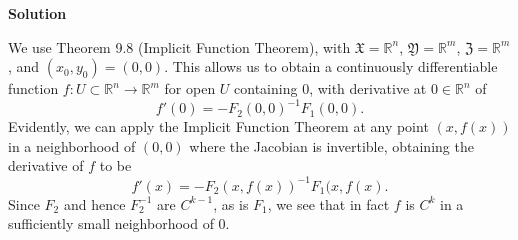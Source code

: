 \documentclass{article}
\begin{document}
\begin{enumerate}
\begin{itemize}
{\bf Solution}

We use Theorem 9.8 (Implicit Function Theorem), with \(\mathfrak{X} = \mathbb{R}^n\), \(\mathfrak{Y} = \mathbb{R}^m\), \(\mathfrak{Z} = \mathbb{R}^m\), and \((x_0,y_0) = (0,0)\).  This allows us to obtain a continuously differentiable function \(f : U \subset \mathbb{R}^n \to \mathbb{R}^m\) for open \(U\) containing \(0\), with derivative at \(0 \in \mathbb{R}^n\) of
\[f'(0) = -F_2(0,0)^{-1} F_1(0,0).\]
Evidently, we can apply the Implicit Function Theorem at any point \((x,f(x))\) in a neighborhood of \((0,0)\) where the Jacobian is invertible, obtaining the derivative of \(f\) to be
\[f'(x) = -F_2(x,f(x))^{-1} F_1(x,f(x).\]
Since \(F_2\) and hence \(F_2^{-1}\) are \(C^{k-1}\), as is \(F_1\), we see that in fact \(f\) is \(C^k\) in a sufficiently small neighborhood of \(0\).



\end{itemize}




\end{enumerate}
\end{document}
